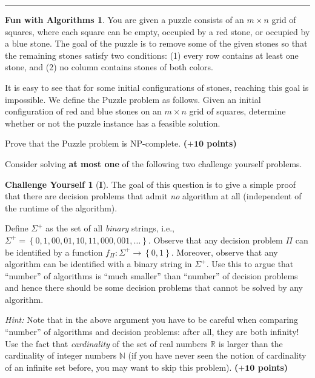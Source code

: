 \documentclass{article}
\theoremstyle{definition}
\newtheorem*{fun}{Fun with Algorithms}
\newtheorem*{challenge}{Challenge Yourself}
\def\fline{\rule{0.75\linewidth}{0.5pt}}
\newcommand{\finishline}{\begin{center}\fline\end{center}}
\newcommand{\grade}[1]{\hfill{\textbf{($\mathbf{#1}$ points)}}}
\newcommand{\set}[1]{\ensuremath{\left\{ #1 \right\}}}
\begin{document}
\finishline


\begin{fun}
	You are given a puzzle consists of an $m \times n$ grid of squares, where each
square can be empty, occupied by a red stone, or occupied by a blue stone. The goal of the puzzle
is to remove some of the given stones so that the remaining stones satisfy two conditions: (1) every row contains at least one stone,
and (2) no column contains stones of both colors. 

It is easy to see that for some initial configurations of stones, reaching this goal is impossible. 
We define the Puzzle problem as follows. Given an initial configuration of red and blue stones on an $m \times n$ grid of squares,
determine whether or not the puzzle instance has a feasible solution. 

Prove that the Puzzle problem is NP-complete. \grade{+10}
\end{fun}

\newpage

Consider solving \textbf{at most one} of the following two challenge yourself problems. 

\bigskip

\begin{challenge}[\textbf{I}] 
	The goal of this question is to give a simple proof that there are decision problems that admit \emph{no} algorithm at all (independent of the runtime of the algorithm). 
	
	Define $\Sigma^+$ as the set of all \emph{binary} strings, i.e., $\Sigma^{+} = \set{0,1,00,01,10,11,000,001,\ldots}$. Observe that any decision problem $\Pi$ can be identified by a function $f_{\Pi} : \Sigma^{+} \rightarrow \set{0,1}$. 
	Moreover, observe that any algorithm can be identified with a binary string in $\Sigma^{+}$. Use this to argue that ``number'' of algorithms is ``much smaller'' than ``number'' of decision problems and hence there should be some decision problems
	that cannot be solved by any algorithm. 
	
	\emph{Hint:} Note that in the above argument you have to be careful when comparing ``number'' of algorithms and decision problems: after all, they are both infinity! Use the fact that \emph{cardinality} of the set of real numbers $\mathbb{R}$ is larger than the cardinality of integer numbers $\mathbb{N}$ (if you have never seen the notion of cardinality of an infinite set before, you may want to skip this problem).  \grade{+10}
	
\end{challenge}
\end{document}
